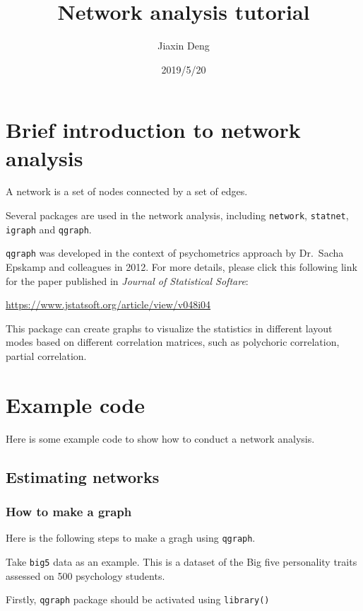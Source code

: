 \documentclass[]{article}
\title{Network analysis tutorial}
\author{Jiaxin Deng}
\date{2019/5/20}
\begin{document}
\maketitle

\section{Brief introduction to network
analysis}\label{brief-introduction-to-network-analysis}

A network is a set of nodes connected by a set of edges.

Several packages are used in the network analysis, including
\texttt{network}, \texttt{statnet}, \texttt{igraph} and \texttt{qgraph}.

\texttt{qgraph} was developed in the context of psychometrics approach
by Dr.~Sacha Epskamp and colleagues in 2012. For more details, please
click this following link for the paper published in \emph{Journal of
Statistical Softare}:

\url{https://www.jstatsoft.org/article/view/v048i04}

This package can create graphs to visualize the statistics in different
layout modes based on different correlation matrices, such as polychoric
correlation, partial correlation.

\section{Example code}\label{example-code}

Here is some example code to show how to conduct a network analysis.

\subsection{Estimating networks}\label{estimating-networks}

\subsubsection{How to make a graph}\label{how-to-make-a-graph}

Here is the following steps to make a gragh using \texttt{qgraph}.

Take \texttt{big5} data as an example. This is a dataset of the Big five
personality traits assessed on 500 psychology students.

Firstly, \texttt{qgraph} package should be activated using
\texttt{library()}
\end{document}
